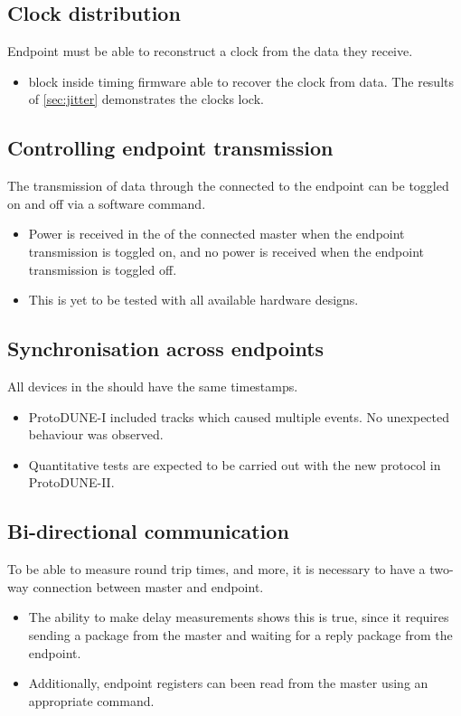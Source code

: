 \documentclass{dune}
\begin{document}
\subsection{Clock distribution}
Endpoint must be able to reconstruct a clock from the data they receive.
\begin{itemize}
  \item {} block inside timing firmware able to recover the clock from data.
  The results of \ref{sec:jitter} demonstrates the clocks lock.
\end{itemize}

\subsection{Controlling endpoint transmission}
The transmission of data through the  connected to the endpoint can be toggled on and off via a software command.
\begin{itemize}
  \item Power is received in the  of the connected master when the endpoint transmission is toggled on, and no power is received when the endpoint transmission is toggled off.
  \item This is yet to be tested with all available hardware designs.
\end{itemize}

\subsection{Synchronisation across endpoints}
All devices in the  should have the same timestamps.
\begin{itemize}
  \item ProtoDUNE-I included tracks which caused multiple  events.
    No unexpected behaviour was observed.
  \item Quantitative tests are expected to be carried out with the new protocol in ProtoDUNE-II.
\end{itemize}

\subsection{Bi-directional communication}
To be able to measure round trip times, and more, it is necessary to have a two-way connection between master and endpoint.
\begin{itemize}
  \item The ability to make delay measurements shows this is true, since it requires sending a package from the master and waiting for a reply package from the endpoint.
  \item Additionally, endpoint registers can been read from the master using an appropriate command.
\end{itemize}
\end{document}
